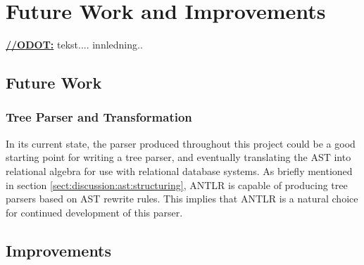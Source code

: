 \chapter{Future Work and Improvements}
\label{sect:summary:future_work}
\underline{\textbf{\LARGE //ODOT:}} tekst.... innledning..


\section{Future Work}

\subsection{Tree Parser and Transformation}
In its current state, the parser produced throughout this project could be a good
starting point for writing a tree parser, and eventually translating the AST
into relational algebra for use with relational database systems. As briefly
mentioned in section \ref{sect:discussion:ast:structuring}, ANTLR is capable of
producing tree parsers based on AST rewrite rules. This implies that ANTLR is a
natural choice for continued development of this parser.

\section{Improvements}
\label{sect:future:improvements}


